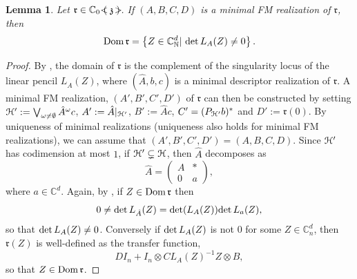 \documentclass{article}
\newtheorem{lem}[thm]{Lemma}
\theoremstyle{definition}
\theoremstyle{remark}
\numberwithin{equation}{section}
\newcommand{\bpm}{\begin{pmatrix}}
\newcommand{\epm}{\end{pmatrix}}
\newcommand{\mr}{\ensuremath{\mathrm}}
\newcommand{\mf}{\ensuremath{\mathfrak}}
\newcommand{\om}{\ensuremath{\omega}}
\def\C{\mathbb{C}}
\def\N{\mathbb{N}}
\def\fr{\mathfrak{r}}
\def\nbdom{\mr{Dom} \, }
\def\ratfps{\C _0 \ \mathclap{\, <}{\left( \right.} \,  \mf{z} \, \mathclap{ \, \, \, \, >}{\left. \right)} }
\begin{document}
\begin{lem}
Let $\fr \in \ratfps$. If $(A , B , C , D )$ is a minimal FM realization of $\fr$, then 
$$\nbdom \fr = \left\{ Z \in  \C ^d _\N | \ \mr{det} \, L_A (Z) \neq 0 \right\}.$$
\end{lem}

\begin{proof}
By \cite[Theorem 3.5]{Volcic}, the domain of $\fr$ is the complement of the singularity locus of the linear pencil $L_{\hat{A}} (Z)$, where $(\hat{A}, b, c)$ is a minimal descriptor realization of $\fr$. A minimal FM realization, $(A' , B ' , C ' , D')$ of $\fr$ can then be constructed by setting $\cH ' := \bigvee _{\om \neq \emptyset} \hat{A}^{\om} c$, $A' := \hat{A} | _{{\mathcal H} '}$, $B' := \hat{A} c$, $C' = (P_{{\mathcal H} '} b) ^*$ and $D' := \fr (0)$. By uniqueness of minimal realizations (uniqueness also holds for minimal FM realizations), we can assume that $(A',B' , C' , D' ) = (A,B,C,D)$. Since ${\mathcal H} '$ has codimension at most $1$, if ${\mathcal H} ' \subsetneq {\mathcal H}$, then $\hat{A}$ decomposes as 
$$ \hat{A} = \bpm A & * \\ 0 & a \epm, $$ where $a \in \C ^d$. Again, by \cite[Theorem 3.5]{Volcic}, if $Z \in \nbdom \fr$ then 
$$ 0 \neq \mr{det} \, L_{\hat{A}} (Z) = \mr{det} (L_{A} (Z) ) \mr{det} \, L_a (Z), $$ so that $\mr{det} \, L_A (Z) \neq 0$. Conversely if $\mr{det} \, L_A (Z)$ is not $0$ for some $Z \in \C ^d _n$, then $\fr (Z)$ is well-defined as the transfer function,
$$ D I_n + I_n \otimes C L_A (Z) ^{-1} Z \otimes B, $$ so that $Z \in \nbdom \fr$.
\end{proof}
\end{document}
